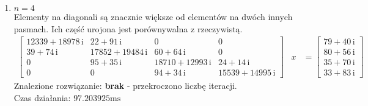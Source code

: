 \documentclass[12pt]{article}
\begin{document}
\begin{enumerate}[label=\textbf{Układ \arabic*}]
		\item
			$n = 4$\\
			Elementy na diagonali są znacznie większe od elementów na dwóch innych pasmach. Ich część urojona jest porównywalna z rzeczywistą.
			{\small
			\begin{align*}
				\left[
					\begin{array}{cccc} 12339 + 18978\, \mathrm{i} & 22 + 91\, \mathrm{i} & 0 & 0\\ 39 + 74\, \mathrm{i} & 17852 + 19484\, \mathrm{i} & 60 + 64\, \mathrm{i} & 0\\ 0 & 95 + 35\, \mathrm{i} & 18710 + 12993\, \mathrm{i} & 24 + 14\, \mathrm{i}\\ 0 & 0 & 94 + 34\, \mathrm{i} & 15539 + 14995\, \mathrm{i} \end{array}
				\right]
				&x
				&=
				\left[
					\begin{array}{c} 79 + 40\, \mathrm{i}\\ 80 + 56\, \mathrm{i}\\ 35 + 70\, \mathrm{i}\\ 33 + 83\, \mathrm{i} \end{array}
				\right]
			\end{align*}
			}%
			Znalezione rozwiązanie: \textbf{brak} - przekroczono liczbę iteracji.\\
			Czas działania: $97.203925\text{ms}$\\
		
	\end{enumerate}
\end{document}
